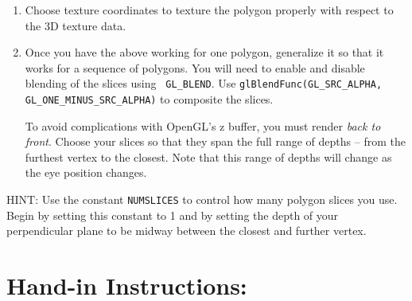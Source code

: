 \documentclass[12pt]{article}
\begin{document}
\begin{enumerate}
\item Choose texture coordinates to texture the polygon properly with
  respect to the 3D texture data.

\item Once you have the above working for one polygon, generalize it
   so that it works for a sequence of polygons.  You will need to
  enable and disable blending of the slices using {\tt
    GL\_BLEND}. \newline Use {\tt glBlendFunc(GL\_SRC\_ALPHA,
    GL\_ONE\_MINUS\_SRC\_ALPHA)} to composite the slices.

  To avoid complications with OpenGL's z buffer, you must
  render {\it back to front}.  Choose your slices so that they span
  the full range of depths -- from the furthest vertex to the closest.
  Note that this range of depths will change as the eye position
  changes.


\end{enumerate} 

\noindent
  HINT: Use the constant {\tt NUMSLICES} to control how many polygon
  slices you use.  Begin by setting this constant to 1 and by setting
  the depth of your perpendicular plane to be midway between the
  closest and further vertex.





\section*{Hand-in Instructions:}
\end{document}
